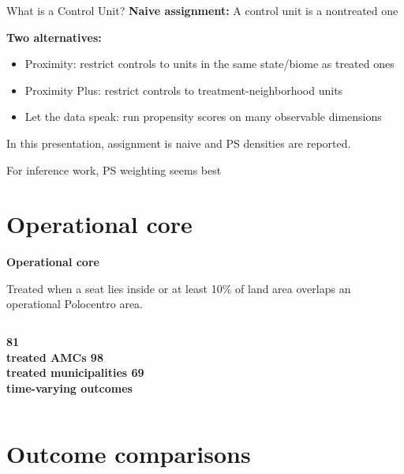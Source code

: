 \documentclass[aspectratio=169]{beamer}
\begin{document}
\begin{frame}{What is a Control Unit?}
\textbf{Naive assignment:} A control unit is a nontreated one
\vspace{1em}

\textbf{Two alternatives:}
\begin{itemize}
    \item Proximity: restrict controls to units in the same state/biome as treated ones
    \item Proximity Plus: restrict controls to treatment-neighborhood units
    \item Let the data speak: run propensity scores on many observable dimensions
\end{itemize}
\vspace{1em}

In this presentation, assignment is naive and PS densities are reported.

For inference work, PS weighting seems best

\end{frame}
\section{Operational core}
\begin{frame}[plain]
\vfill
{\Huge\bfseries Operational core\par}
\vspace{1em}
{\large Treated when a seat lies inside or at least 10\% of land area overlaps an operational Polocentro area.\par}
\vspace{2em}
\begin{columns}[T,totalwidth=\textwidth]
\centering\Huge\bfseries 81\\\normalsize treated AMCs
\centering\Huge\bfseries 98\\\normalsize treated municipalities
\centering\Huge\bfseries 69\\\normalsize time-varying outcomes
\end{columns}
\vfill
\end{frame}
\section{Outcome comparisons}

\end{document}
